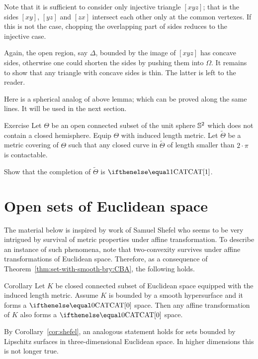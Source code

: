 Note that it is sufficient to consider only injective triangle $[xyz]$;
that is the sides $[xy]$, $[yz]$ and $[zx]$ intersect each other only at the common vertexes.
If this is not the case, chopping the overlapping part of sides reduces to the injective case.

Again, the open region, say $\Delta$, bounded by the image of $[xyz]$  has concave sides, otherwise one could shorten the sides by pushing them into $\Omega$.
It remains to show that any triangle with concave sides is thin.
The latter is left to the reader.
\qeds

Here is a spherical analog of above lemma;
which can be proved along the same lines.
It will be used in the next section. 

\begin{thm}{Exercise}\label{ex:bishop-sphere}
Let $\Theta$ be an open connected subset of the unit sphere $\mathbb{S}^2$ which does not contain a closed hemisphere.
Equip $\Theta$ with induced length metric.
Let $\tilde \Theta$ be a metric covering of $\Theta$ 
such that any closed curve in $\tilde \Theta$ of length smaller than $2\cdot\pi$ is contactable.

Show that the completion of $\tilde \Theta$ is $\CAT{1}$.
\end{thm}

\section{Open sets of Euclidean space}

The material below is inspired by work of Samuel Shefel who seems to be very intrigued by survival of metric properties under affine transformation.
To describe an instance of such phenomena,
note that two-convexity survives under affine transformations of Euclidean space.
Therefore, as a consequence of Theorem~\ref{thm:set-with-smooth-bry:CBA}, the following holds.

\begin{thm}{Corollary}
Let $K$ be closed connected subset of Euclidean space 
equipped with the induced length metric.
Assume $K$ is bounded by a smooth hypersurface and it forms a $\CAT{0}$ space. 
Then any affine transformation of $K$ also forms a $\CAT{0}$ space.
\end{thm}

By Corollary~\ref{cor:shefel}, an analogous statement holds for sets bounded by Lipschitz surfaces in three-dimensional Euclidean space.
In higher dimensions this is not longer true.

